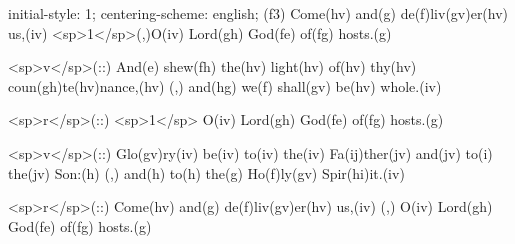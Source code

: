 initial-style: 1;
centering-scheme: english;
(f3) Come(hv) and(g) de(f)liv(gv)er(hv) us,(iv) <sp>1</sp>(,)O(iv) Lord(gh) God(fe) of(fg) hosts.(g) 

<sp>v</sp>(::) And(e) shew(fh) the(hv) light(hv) of(hv) thy(hv) coun(gh)te(hv)nance,(hv) (,) and(hg) we(f) shall(gv) be(hv) whole.(iv) 

<sp>r</sp>(::) <sp>1</sp> O(iv) Lord(gh) God(fe) of(fg) hosts.(g)

<sp>v</sp>(::) Glo(gv)ry(iv) be(iv) to(iv) the(iv) Fa(ij)ther(jv) and(jv) to(i) the(jv) Son:(h) (,) and(h) to(h) the(g) Ho(f)ly(gv) Spir(hi)it.(iv)

<sp>r</sp>(::) Come(hv) and(g) de(f)liv(gv)er(hv) us,(iv) (,) O(iv) Lord(gh) God(fe) of(fg) hosts.(g) 